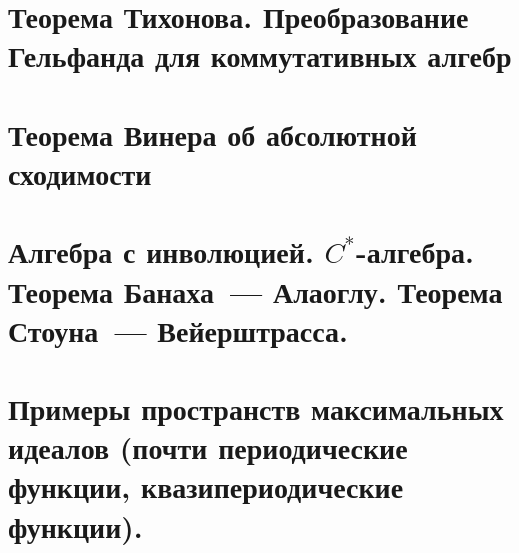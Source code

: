 \documentclass[12pt]{extarticle}
\theoremstyle{definition}
\begin{document}
    \section{Теорема Тихонова. Преобразование Гельфанда для коммутативных алгебр}

    \section{Теорема Винера об абсолютной сходимости}

    \section{Алгебра с инволюцией. $C^*$-алгебра. Теорема Банаха~--- Алаоглу. Теорема Стоуна~--- Вейерштрасса.}

    \section{Примеры пространств максимальных идеалов (почти периодические функции, квазипериодические функции).}
\end{document}
